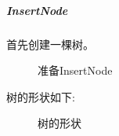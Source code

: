 \documentclass[supercite]{Experimental_Report}
\theoremstyle{definition}
\begin{document}
\subparagraph{InsertNode}
\noindent
首先创建一棵树。
\begin{figure}[H]
	\centering
	\centering
	\caption{准备InsertNode}
	\label{fig5-28}
\end{figure}

\clearpage
\noindent
树的形状如下:
\begin{figure}[htbp]
	\centering
	\centering
	\caption{树的形状}
	\label{fig5-29}
\end{figure}
\end{document}
